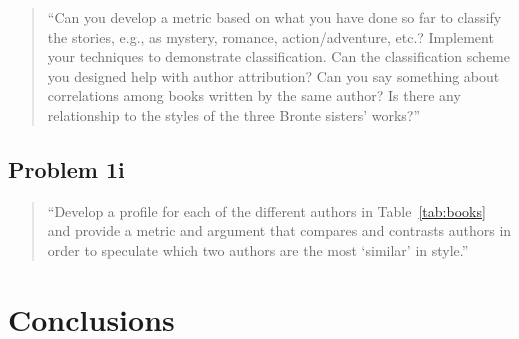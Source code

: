 \documentclass[conference]{IEEEtran}
\begin{document}
\begin{quote}
``Can you develop a metric based on what you have done so far to classify the stories, e.g., 
as mystery, romance, action/adventure, etc.? Implement your techniques to demonstrate 
classification. Can the classification scheme you designed help with author attribution? 
Can you say something about correlations among books written by the same author? 
Is there any relationship to the styles of the three Bronte sisters' works?''
\end{quote}

\subsection{Problem 1i}

\begin{quote}
``Develop a profile for each of the different authors in Table~\ref{tab:books} and provide 
a metric and argument that compares and contrasts authors in order to speculate which 
two authors are the most `similar' in style.''
\end{quote}


\section{Conclusions}






\begin{framed}
\fontsize{5.65}{6.78}\selectfont

\end{framed}
\end{document}
